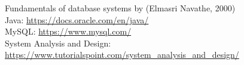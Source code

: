 \cleardoublepage
{}
\begin{flushleft}
	
\begin{thebibliography}{99}
	
\bibitem{}Fundamentals of database systems by (Elmasri Navathe, 2000)\\

\bibitem{} Java: \url{https://docs.oracle.com/en/java/}\\

\bibitem{} MySQL: \url{https://www.mysql.com/}\\

\bibitem{}System Analysis and Design: \url{https://www.tutorialspoint.com/system_analysis_and_design/}\\
\end{thebibliography}

\end{flushleft}
